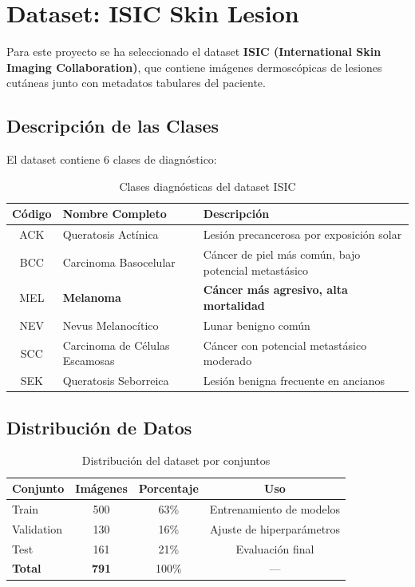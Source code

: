 \documentclass[12pt,a4paper]{article}
\begin{document}
\newpage

\section{Dataset: ISIC Skin Lesion}

Para este proyecto se ha seleccionado el dataset \textbf{ISIC (International Skin Imaging Collaboration)}, que contiene imágenes dermoscópicas de lesiones cutáneas junto con metadatos tabulares del paciente.

\subsection{Descripción de las Clases}

El dataset contiene 6 clases de diagnóstico:

\begin{table}[H]
\centering
\begin{tabular}{clp{8cm}}
\toprule
\textbf{Código} & \textbf{Nombre Completo} & \textbf{Descripción} \\
\midrule
ACK & Queratosis Actínica & Lesión precancerosa por exposición solar \\
BCC & Carcinoma Basocelular & Cáncer de piel más común, bajo potencial metastásico \\
\rowcolor{red!15} MEL & \textbf{Melanoma} & \textbf{Cáncer más agresivo, alta mortalidad} \\
NEV & Nevus Melanocítico & Lunar benigno común \\
SCC & Carcinoma de Células Escamosas & Cáncer con potencial metastásico moderado \\
SEK & Queratosis Seborreica & Lesión benigna frecuente en ancianos \\
\bottomrule
\end{tabular}
\caption{Clases diagnósticas del dataset ISIC}
\end{table}

\subsection{Distribución de Datos}

\begin{table}[H]
\centering
\begin{tabular}{lccc}
\toprule
\textbf{Conjunto} & \textbf{Imágenes} & \textbf{Porcentaje} & \textbf{Uso} \\
\midrule
Train & 500 & 63\% & Entrenamiento de modelos \\
Validation & 130 & 16\% & Ajuste de hiperparámetros \\
Test & 161 & 21\% & Evaluación final \\
\midrule
\textbf{Total} & \textbf{791} & 100\% & --- \\
\bottomrule
\end{tabular}
\caption{Distribución del dataset por conjuntos}
\end{table}
\end{document}

